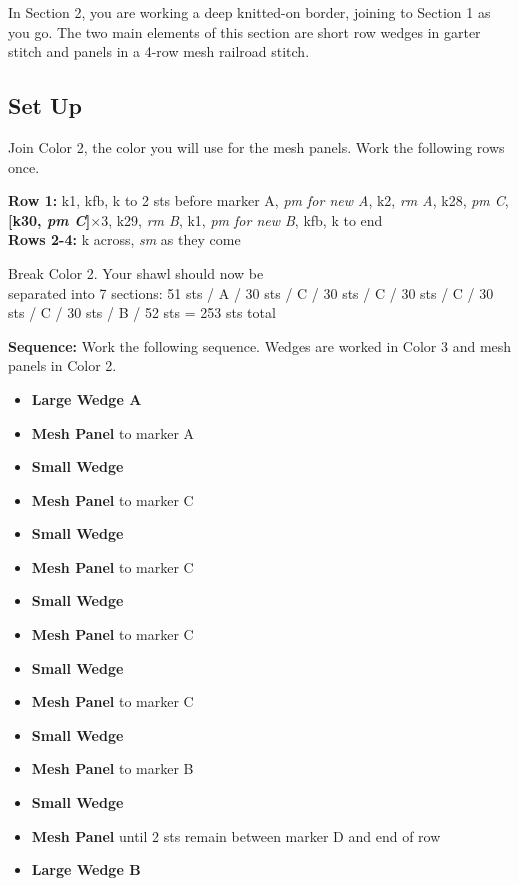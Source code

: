 \documentclass[12pt]{article}
\newcommand{\rowDir}[1]{\textbf{#1:}} %
\newcommand{\x}{$\times$}			%
\newcommand{\setrepeat}[2]{\textbf{[#1]}\x{#2}}		%
\renewcommand{\pm}[1]{\emph{pm #1}} %
\newcommand{\sm}{\emph{sm}} %
\renewcommand{\rm}[1]{\emph{rm #1}} %
\newenvironment{unframed}
    {%
\begin{addmargin}[2em]{0pt}
	\setlength{\parindent}{-2em}}
    {\setlength{\parindent}{0em}
	\end{addmargin}}
\begin{document}
\begin{multicols}{2}
In Section 2, you are working a deep knitted-on border, joining to Section 1 as you go. The two main elements of this section are short row wedges in garter stitch and panels in a 4-row mesh railroad stitch.

\subsection*{Set Up}

Join Color 2, the color you will use for the mesh panels. Work the following rows once.
\begin{unframed}
\rowDir{Row 1} k1, kfb, k to 2 sts before marker A, \pm{for new A}, k2, \rm{A}, k28, \pm{C}, \\ \setrepeat{k30, \pm{C}}{3}, k29, \rm{B}, k1, \pm{for new B}, kfb, k to end \\
\rowDir{Rows 2-4} k across, \sm {} as they come
\end{unframed}
Break Color 2. Your shawl should now be \\ separated into 7 sections: 51 sts / A / 30 sts / C / 30 sts / C / 30 sts / C / 30 sts / C / 30 sts / B / 52 sts  = 253 sts total

\vfill
\newpage

\begin{framed}
\textbf{Sequence:} Work the following sequence. Wedges are worked in Color 3 and mesh panels in Color 2.
\renewcommand\labelitemi{$\square$}
\begin{itemize}[itemsep=-.5em]
\item \textbf{Large Wedge A}
\item \textbf{Mesh Panel} to marker A
\item \textbf{Small Wedge}
\item \textbf{Mesh Panel} to marker C
\item \textbf{Small Wedge}
\item \textbf{Mesh Panel} to marker C
\item \textbf{Small Wedge}
\item \textbf{Mesh Panel} to marker C
\item \textbf{Small Wedge}
\item \textbf{Mesh Panel} to marker C
\item \textbf{Small Wedge}
\item \textbf{Mesh Panel} to marker B
\item \textbf{Small Wedge}
\item \textbf{Mesh Panel} until 2 sts remain between marker D and end of row
\item \textbf{Large Wedge B}
\end{itemize}
\end{framed}


\end{multicols}
\end{document}
